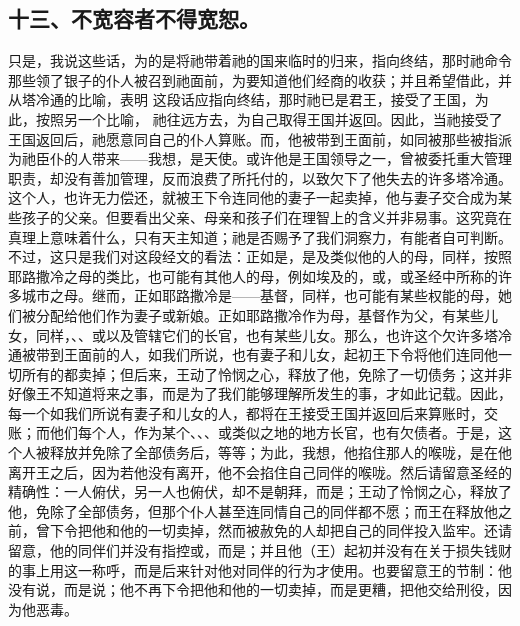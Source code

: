 
\subsection{十三、不宽容者不得宽恕。}

只是，我说这些话，为的是将祂带着祂的国来临时的归来，指向终结，那时祂命令那些领了银子的仆人被召到祂面前，为要知道他们经商的收获；并且希望借此，并从塔冷通的比喻，表明 这段话应指向终结，那时祂已是君王，接受了王国，为此，按照另一个比喻， 祂往远方去，为自己取得王国并返回。因此，当祂接受了王国返回后，祂愿意同自己的仆人算账。而，他被带到王面前，如同被那些被指派为祂臣仆的人带来——我想，是天使。或许他是王国领导之一，曾被委托重大管理职责，却没有善加管理，反而浪费了所托付的，以致欠下了他失去的许多塔冷通。这个人，也许无力偿还，就被王下令连同他的妻子一起卖掉，他与妻子交合成为某些孩子的父亲。但要看出父亲、母亲和孩子们在理智上的含义并非易事。这究竟在真理上意味着什么，只有天主知道；祂是否赐予了我们洞察力，有能者自可判断。不过，这只是我们对这段经文的看法：正如是，是及类似他的人的母，同样，按照耶路撒冷之母的类比，也可能有其他人的母，例如埃及的，或，或圣经中所称的许多城市之母。继而，正如耶路撒冷是——基督，同样，也可能有某些权能的母，她们被分配给他们作为妻子或新娘。正如耶路撒冷作为母，基督作为父，有某些儿女，同样，、、或以及管辖它们的长官，也有某些儿女。那么，也许这个欠许多塔冷通被带到王面前的人，如我们所说，也有妻子和儿女，起初王下令将他们连同他一切所有的都卖掉；但后来，王动了怜悯之心，释放了他，免除了一切债务；这并非好像王不知道将来之事，而是为了我们能够理解所发生的事，才如此记载。因此，每一个如我们所说有妻子和儿女的人，都将在王接受王国并返回后来算账时，交账；而他们每个人，作为某个、、、或类似之地的地方长官，也有欠债者。于是，这个人被释放并免除了全部债务后，等等；为此，我想，他掐住那人的喉咙，是在他离开王之后，因为若他没有离开，他不会掐住自己同伴的喉咙。然后请留意圣经的精确性：一人俯伏，另一人也俯伏，却不是朝拜，而是；王动了怜悯之心，释放了他，免除了全部债务，但那个仆人甚至连同情自己的同伴都不愿；而王在释放他之前，曾下令把他和他的一切卖掉，然而被赦免的人却把自己的同伴投入监牢。还请留意，他的同伴们并没有指控或，而是；并且他（王）起初并没有在关于损失钱财的事上用这一称呼，而是后来针对他对同伴的行为才使用。也要留意王的节制：他没有说，而是说；他不再下令把他和他的一切卖掉，而是更糟，把他交给刑役，因为他恶毒。 